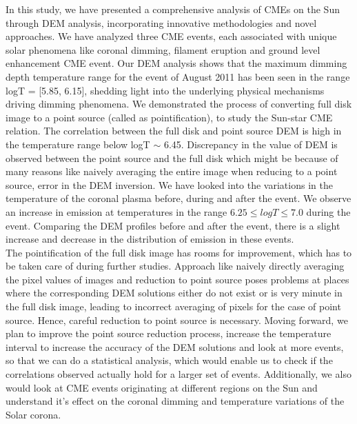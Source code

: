 In this study, we have presented a comprehensive analysis of CMEs on the Sun through DEM analysis, incorporating innovative methodologies and novel approaches. We have analyzed three CME events, each associated with unique solar phenomena like coronal dimming, filament eruption and ground level enhancement CME event. Our DEM analysis shows that the maximum dimming depth temperature range for the event of  August 2011 has been seen in the range logT = [5.85, 6.15], shedding light into the underlying physical mechanisms driving dimming phenomena. We demonstrated the process of converting full disk image to a point source (called as pointification), to study the Sun-star CME relation. The correlation between the full disk and point source DEM is high in the temperature range below logT $\sim$ 6.45. Discrepancy in the value of DEM is observed between the point source and the full disk which might be because of many reasons like naively averaging the entire image when reducing to a point source, error in the DEM inversion. We have looked into the variations in the temperature of the coronal plasma before, during and after the event. We observe an increase in emission at temperatures in the range $6.25 \le logT \le 7.0$ during the event. Comparing the DEM profiles before and after the event, there is a slight increase and decrease in the distribution of emission in these events.\\

The pointification of the full disk image has rooms for improvement, which has to be taken care of during further studies. Approach like naively directly averaging the pixel values of images and reduction to point source poses problems at places where the corresponding DEM solutions either do not exist or is very minute in the full disk image, leading to incorrect averaging of pixels for the case of point source. Hence, careful reduction to point source is necessary. Moving forward, we plan to improve the point source reduction process, increase the temperature interval to increase the accuracy of the DEM solutions and look at more events, so that we can do a statistical analysis, which would enable us to check if the correlations observed actually hold for a larger set of events. Additionally, we also would look at CME events originating at different regions on the Sun and understand it's effect on the coronal dimming and temperature variations of the Solar corona.

